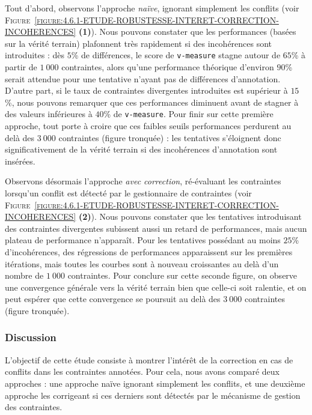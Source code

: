 			Tout d'abord, observons l'approche \textit{naïve}, ignorant simplement les conflits (voir \textsc{Figure~\ref{figure:4.6.1-ETUDE-ROBUSTESSE-INTERET-CORRECTION-INCOHERENCES}} \textbf{(1)}).
			Nous pouvons constater que les performances (basées sur la vérité terrain) plafonnent très rapidement si des incohérences sont introduites : dès $5$\% de différences, le score de \texttt{v-measure} stagne autour de $65$\% à partir de $1~000$ contraintes, alors qu'une performance théorique d'environ $90$\% serait attendue pour une tentative n'ayant pas de différences d'annotation.
			D'autre part, si le taux de contraintes divergentes introduites est supérieur à $15$\%, nous pouvons remarquer que ces performances diminuent avant de stagner à des valeurs inférieures à $40$\% de \texttt{v-measure}.
			Pour finir sur cette première approche, tout porte à croire que ces faibles seuils performances perdurent au delà des $3~000$ contraintes (figure tronquée) : les tentatives s'éloignent donc significativement de la vérité terrain si des incohérences d'annotation sont insérées.
			
			
			Observons désormais l'approche \textit{avec correction}, ré-évaluant les contraintes lorsqu'un conflit est détecté par le gestionnaire de contraintes (voir \textsc{Figure~\ref{figure:4.6.1-ETUDE-ROBUSTESSE-INTERET-CORRECTION-INCOHERENCES}} \textbf{(2)}).
			Nous pouvons constater que les tentatives introduisant des contraintes divergentes subissent aussi un retard de performances, mais aucun plateau de performance n'apparaît.
			Pour les tentatives possédant au moins $25$\% d'incohérences, des régressions de performances apparaissent sur les premières itérations, mais toutes les courbes sont à nouveau croissantes au delà d'un nombre de $1~000$ contraintes.
			Pour conclure sur cette seconde figure, on observe une convergence générale vers la vérité terrain bien que celle-ci soit ralentie, et on peut espérer que cette convergence se poursuit au delà des $3~000$ contraintes (figure tronquée).

		\subsubsection{Discussion}
		
			L'objectif de cette étude consiste à montrer l'intérêt de la correction en cas de conflits dans les contraintes annotées.
			Pour cela, nous avons comparé deux approches : une approche naïve ignorant simplement les conflits, et une deuxième approche les corrigeant si ces derniers sont détectés par le mécanisme de gestion des contraintes.
		
